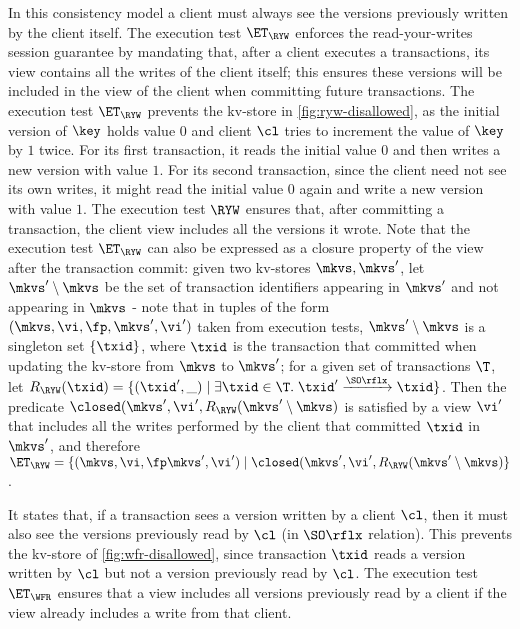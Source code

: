 In this consistency model a client must always see the versions previously written by the client itself. 
The execution test $\ET_{\RYW}$ enforces the read-your-writes session guarantee by 
mandating that, after a client executes a transactions, its view contains all the writes of the client 
itself; this ensures these versions will be included in the view of the client when committing future 
transactions.
The execution test $\ET_{\RYW}$ prevents the kv-store in \cref{fig:ryw-disallowed}, 
as the initial version of $\key$ holds value $0$ 
and client $\cl$ tries to increment the value of $\key$ by $1$ twice.  
For its first transaction, it reads the initial value $0$ and then writes a new version with value $1$. 
For its second transaction, since the client need not see its own writes, 
it might read the initial value $0$ again and write a new version with value $1$.
The execution test $\RYW$ ensures that, after committing a transaction, 
the client view includes all the versions it wrote.  
Note that the execution test $\ET_{\RYW}$ can also be expressed 
as a closure property of the view after the transaction commit: given 
two kv-stores $\mkvs, \mkvs'$, let  
$\mkvs' \setminus \mkvs$ be the set of transaction identifiers appearing 
in $\mkvs'$ and not appearing in $\mkvs$ - note that in tuples of the form 
$(\mkvs, \vi, \fp, \mkvs', \vi')$ taken from execution tests, $\mkvs' \setminus \mkvs$ 
is a singleton set $\{\txid\}$, where $\txid$ is the transaction that committed 
when updating the kv-store from $\mkvs$ to $\mkvs'$; for a given 
set of transactions $\T$, let $R_{\RYW}(\txid) = \{(\txid', \_) \mid \exists \txid \in \T.\; \txid' \xrightarrow{\SO\rflx} \txid\}$. 
Then the predicate $\closed(\mkvs', \vi', R_{\RYW}(\mkvs' \setminus \mkvs)$ is satisfied by a 
view $\vi'$ that includes all the writes performed by the client that committed $\txid$ in $\mkvs'$, 
and therefore $\ET_{\RYW} = \{(\mkvs, \vi, \fp \mkvs', \vi') \mid \closed(\mkvs', \vi', R_{\RYW}(\mkvs' \setminus \mkvs)\}$.
 


It states that, if a transaction sees a version written by a
client $\cl$, then it must also see the versions previously read by $\cl$ (in $\SO\rflx$ relation).
This prevents the kv-store of \cref{fig:wfr-disallowed},
since transaction $\txid$ reads a version written by $\cl$ but
not a version previously read by $\cl$.
The execution test $\ET_{\WFR}$ ensures
that a view includes all versions previously read by a client 
if the view already includes a write from that client. 

